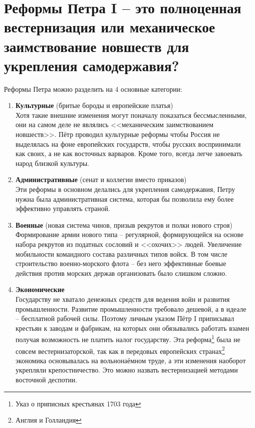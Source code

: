\documentclass[12pt]{article}
\newcommand{\red}[1]{{\color{red}{#1}}}
\begin{document}
  \setcounter{section}{4}
  \section{Реформы Петра I -- это полноценная вестернизация или механическое заимствование новшеств для укрепления самодержавия?}
  Реформы Петра можно разделить на 4 основные категории:
  \begin{enumerate}[label=\textbf{\large\arabic*}]
    \item {\bf\large Культурные} (бритые бороды и европейские платья) \\
    Хотя такие внешние изменения могут поначалу показаться бессмысленными,
    они на самом деле не являлись <<механическим заимствованием новшеств>>.
    Пётр проводил культурные реформы чтобы Россия не выделялась на фоне европейских государств,
    чтобы русских воспринимали как своих, а не как восточных варваров.
    Кроме того, всегда легче завоевать народ близкой культуры.

    \item {\bf\large Административные} (сенат и коллегии вместо приказов) \\
    Эти реформы в основном делались для укрепления самодержавия,
    Петру нужна была административная система, которая бы позволила ему более эффективно управлять страной.

    \item {\bf\large Военные} (новая система чинов, призыв рекрутов и полки нового строя) \\
    Формирование армии нового типа -- регулярной, формирующейся на основе набора рекрутов из податных сословий и <<охочих>> людей.
    Увеличение мобильности командного состава различных типов войск.
    В том числе строительство военно-морского флота --
    без него эффективные боевые действия против морских держав организовать было слишком сложно.

    \item {\bf\large Экономические} \\
    Государству не хватало денежных средств для ведения войн и развития промышленности.
    Развитие промышленности требовало дешевой, а в идеале -- бесплатной рабочей силы.
    Поэтому личным указом Пётр I приписывал крестьян к заводам и фабрикам,
    на которых они обязывались работать взамен получая возможность не платить налог государству.
    Эта реформа\footnote{Указ о приписных крестьянах 1703 года} была не совсем вестернизаторской,
    так как в передовых европейских странах\footnote{Англия и Голландия} экономика основывалась на вольнонаёмном труде,
    а эти изменения наоборот укрепляли крепостничество.
    Это можно назвать вестернизацией методами восточной деспотии.

  \end{enumerate}
\end{document}
